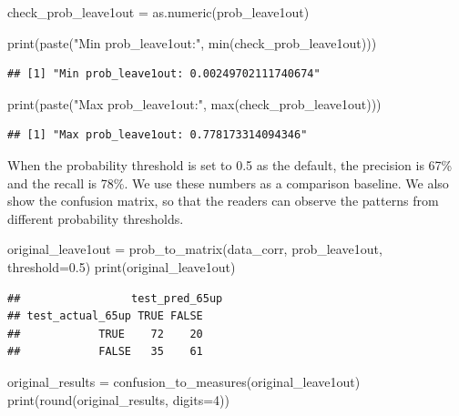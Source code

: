 \documentclass[
]{article}
\newenvironment{Shaded}{\begin{snugshade}}{\end{snugshade}}
\newcommand{\AttributeTok}[1]{\textcolor[rgb]{0.77,0.63,0.00}{#1}}
\newcommand{\DecValTok}[1]{\textcolor[rgb]{0.00,0.00,0.81}{#1}}
\newcommand{\FloatTok}[1]{\textcolor[rgb]{0.00,0.00,0.81}{#1}}
\newcommand{\FunctionTok}[1]{\textcolor[rgb]{0.00,0.00,0.00}{#1}}
\newcommand{\NormalTok}[1]{#1}
\newcommand{\OtherTok}[1]{\textcolor[rgb]{0.56,0.35,0.01}{#1}}
\newcommand{\StringTok}[1]{\textcolor[rgb]{0.31,0.60,0.02}{#1}}
\begin{document}
\begin{Shaded}
\begin{Highlighting}[]
\NormalTok{check\_prob\_leave1out }\OtherTok{=} \FunctionTok{as.numeric}\NormalTok{(prob\_leave1out)}

\FunctionTok{print}\NormalTok{(}\FunctionTok{paste}\NormalTok{(}\StringTok{"Min prob\_leave1out:"}\NormalTok{, }\FunctionTok{min}\NormalTok{(check\_prob\_leave1out)))}
\end{Highlighting}
\end{Shaded}

\begin{verbatim}
## [1] "Min prob_leave1out: 0.00249702111740674"
\end{verbatim}

\begin{Shaded}
\begin{Highlighting}[]
\FunctionTok{print}\NormalTok{(}\FunctionTok{paste}\NormalTok{(}\StringTok{"Max prob\_leave1out:"}\NormalTok{, }\FunctionTok{max}\NormalTok{(check\_prob\_leave1out)))}
\end{Highlighting}
\end{Shaded}

\begin{verbatim}
## [1] "Max prob_leave1out: 0.778173314094346"
\end{verbatim}

When the probability threshold is set to 0.5 as the default, the
precision is 67\% and the recall is 78\%. We use these numbers as a
comparison baseline. We also show the confusion matrix, so that the
readers can observe the patterns from different probability thresholds.

\begin{Shaded}
\begin{Highlighting}[]
\NormalTok{original\_leave1out }\OtherTok{=}  \FunctionTok{prob\_to\_matrix}\NormalTok{(data\_corr, prob\_leave1out, }\AttributeTok{threshold=}\FloatTok{0.5}\NormalTok{)}
\FunctionTok{print}\NormalTok{(original\_leave1out)}
\end{Highlighting}
\end{Shaded}

\begin{verbatim}
##                 test_pred_65up
## test_actual_65up TRUE FALSE
##            TRUE    72    20
##            FALSE   35    61
\end{verbatim}

\begin{Shaded}
\begin{Highlighting}[]
\NormalTok{original\_results }\OtherTok{=} \FunctionTok{confusion\_to\_measures}\NormalTok{(original\_leave1out)}
\FunctionTok{print}\NormalTok{(}\FunctionTok{round}\NormalTok{(original\_results, }\AttributeTok{digits=}\DecValTok{4}\NormalTok{))}
\end{Highlighting}
\end{Shaded}
\end{document}
